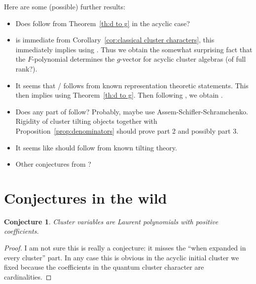 \documentclass[12pt]{amsart}
\newtheorem{conjecture}[theorem]{Conjecture}
\begin{document}
  Here are some (possible) further results:
  \begin{itemize}
    \item Does \cite[Conj. 6.13]{fomin-zelevinsky4} follow from Theorem~\ref{th:d to g} in the acyclic case?
    \item \cite[Conj. 7.17]{fomin-zelevinsky4} is immediate from Corollary~\ref{cor:classical cluster characters}, this immediately implies \cite[Conj. 6.11]{fomin-zelevinsky4} using \cite[Prop. 7.16]{fomin-zelevinsky4}.  
      Thus we obtain the somewhat surprising fact that the $F$-polynomial determines the $g$-vector for acyclic cluster algebras (of full rank?).
    \item It seems that \cite[Con. 7.6]{fomin-zelevinsky4}/\cite[Conj. 3.22]{reading-speyer} follows from known representation theoretic statements.
      This then implies \cite[Conj. 7.10]{fomin-zelevinsky4} using Theorem~\ref{th:d to g}.
      Then following \cite[Rem. 7.11]{fomin-zelevinsky4}, we obtain \cite[Con. 7.2]{fomin-zelevinsky4}.
    \item Does any part of \cite[Conj. 7.4]{fomin-zelevinsky4} follow?  
      Probably, maybe use Assem-Schifler-Schramchenko.
      Rigidity of cluster tilting objects together with Proposition~\ref{prop:denominators} should prove part 2 and possibly part 3.
    \item It seems like \cite[Conj. 3.9]{reading-speyer} should follow from known tilting theory.
    \item Other conjectures from \cite{reading-speyer}?
  \end{itemize}







\section{Conjectures in the wild}

\begin{conjecture}
  Cluster variables are Laurent polynomials with positive coefficients.
\end{conjecture}
\begin{proof}
  I am not sure this is really a conjecture: it misses the ``when expanded in every cluster'' part.
  In any case this is obvious in the acyclic initial cluster we fixed because the coefficients in the quantum cluster character are cardinalities.
\end{proof}
\end{document}
